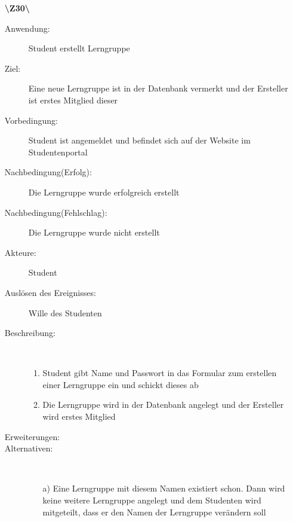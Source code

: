 \documentclass[a4paper]{article}
\begin{document}
\begin{enumerate}
  \item[\textbf{\textbackslash Z30\textbackslash}] \begin{description}
  \item[Anwendung:] Student erstellt Lerngruppe
  \item[Ziel:] Eine neue Lerngruppe ist in der Datenbank vermerkt und der Ersteller ist erstes Mitglied dieser
  	\item[Vorbedingung:] Student ist angemeldet und befindet sich auf der Website im Studentenportal
  	\item[Nachbedingung(Erfolg):] Die Lerngruppe wurde erfolgreich erstellt
  	\item[Nachbedingung(Fehlschlag):] Die Lerngruppe wurde nicht erstellt
  	\item[Akteure:] Student
  	\item[Auslösen des Ereignisses:] Wille des Studenten
  	\item[Beschreibung:]~
  	\begin{enumerate}[1.]
  	  \item Student gibt Name und Passwort in das Formular zum erstellen einer Lerngruppe ein und schickt dieses ab
  	  \item Die Lerngruppe wird in der Datenbank angelegt und der Ersteller wird erstes Mitglied
  	\end{enumerate}
  	\item[Erweiterungen:]
  	\item[Alternativen:] ~
  	\begin{enumerate}
  	  \item[a)] Eine Lerngruppe mit diesem Namen existiert schon. Dann wird keine weitere Lerngruppe angelegt und dem Studenten wird mitgeteilt, dass er den Namen der Lerngruppe verändern soll
  	 \end{enumerate}  
  \end{description}
  \pagebreak
  

\end{enumerate}
\end{document}
